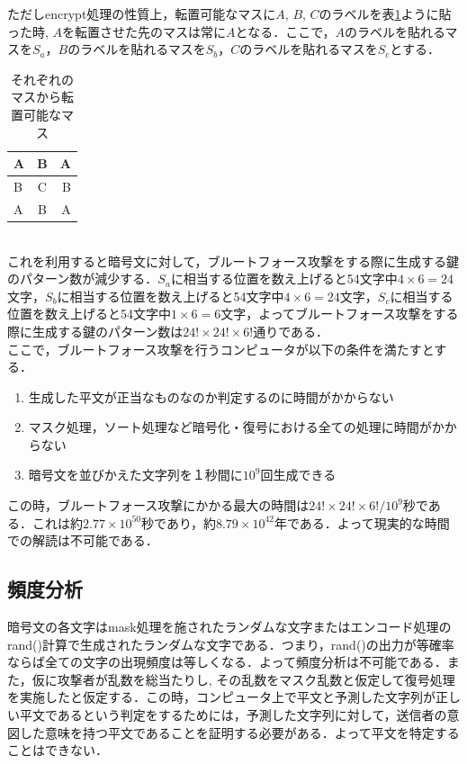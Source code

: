 \documentclass[a4j,titlepage]{jsarticle}
\begin{document}
ただしencrypt処理の性質上，転置可能なマスに\(A\), \(B\), \(C\)のラベルを表\ref{fig:trans-masu}ように貼った時, \(A\)を転置させた先のマスは常に\(A\)となる．ここで，\(A\)のラベルを貼れるマスを\(S_a\)，\(B\)のラベルを貼れるマスを\(S_b\)，\(C\)のラベルを貼れるマスを\(S_c\)とする．
\begin{table}[htb]
  \centering
  \begin{tabular}{|l|c|r|} \hline
    A & B & A \\ \hline
    B & C & B \\ \hline
    A & B & A \\ \hline
  \end{tabular}
  \caption{それぞれのマスから転置可能なマス}
  \label{fig:trans-masu}
\end{table}\\
これを利用すると暗号文に対して，ブルートフォース攻撃をする際に生成する鍵のパターン数が減少する．\(S_a\)に相当する位置を数え上げると54文字中\(4\times6=24\)文字，\(S_b\)に相当する位置を数え上げると54文字中\(4\times6=24\)文字，\(S_c\)に相当する位置を数え上げると54文字中\(1\times6=6\)文字，よってブルートフォース攻撃をする際に生成する鍵のパターン数は\(24!\times24!\times6!\)通りである．\\
ここで，ブルートフォース攻撃を行うコンピュータが以下の条件を満たすとする．
\begin{enumerate}
  \item 生成した平文が正当なものなのか判定するのに時間がかからない
  \item マスク処理，ソート処理など暗号化・復号における全ての処理に時間がかからない
  \item 暗号文を並びかえた文字列を１秒間に\(10^9\)回生成できる
\end{enumerate}
この時，ブルートフォース攻撃にかかる最大の時間は\(24! \times 24! \times 6!/10^9\)秒である．これは約\(2.77 \times 10^{50}\)秒であり，約\(8.79 \times 10^{42}\)年である．よって現実的な時間での解読は不可能である．

\subsection{頻度分析}
暗号文の各文字はmask処理を施されたランダムな文字またはエンコード処理のrand()計算で生成されたランダムな文字である．つまり，rand()の出力が等確率ならば全ての文字の出現頻度は等しくなる．よって頻度分析は不可能である．また，仮に攻撃者が乱数を総当たりし, その乱数をマスク乱数と仮定して復号処理を実施したと仮定する．この時，コンピュータ上で平文と予測した文字列が正しい平文であるという判定をするためには，予測した文字列に対して，送信者の意図した意味を持つ平文であることを証明する必要がある．よって平文を特定することはできない．
\end{document}
